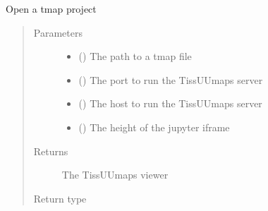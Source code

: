 \documentclass[letterpaper,10pt,english,openany,oneside]{sphinxmanual}
\begin{document}
\begin{fulllineitems}
\label{\detokenize{docs/advanced/jupyter:tissuumaps.jupyter.opentmap}}
\pysigstartsignatures
{}
\pysigstopsignatures
\sphinxAtStartPar
Open a tmap project
\begin{quote}\begin{description}
\item[{Parameters}] \leavevmode\begin{itemize}
\item {} 
\sphinxAtStartPar
{} () \textendash{} The path to a tmap file

\item {} 
\sphinxAtStartPar
{} () \textendash{} The port to run the TissUUmaps server

\item {} 
\sphinxAtStartPar
{} () \textendash{} The host to run the TissUUmaps server

\item {} 
\sphinxAtStartPar
{} () \textendash{} The height of the jupyter iframe

\end{itemize}

\item[{Returns}] \leavevmode
\sphinxAtStartPar
The TissUUmaps viewer

\item[{Return type}] \leavevmode
\sphinxAtStartPar
{\hyperref[\detokenize{docs/advanced/jupyter:tissuumaps.jupyter.TissUUmapsViewer}]{}}

\end{description}\end{quote}

\end{fulllineitems}
\end{document}
